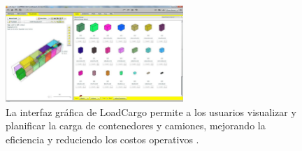 \begin{figure}[H]
    \centering
    \includegraphics[width=0.6\textwidth]{Figures/loadcargo.jpg}
    \caption{La interfaz gráfica de LoadCargo permite a los usuarios visualizar y planificar la carga de contenedores y camiones, mejorando la eficiencia y reduciendo los costos operativos \parencite{loadcargo2024}.}
    \label{fig:loadcargo}
\end{figure}